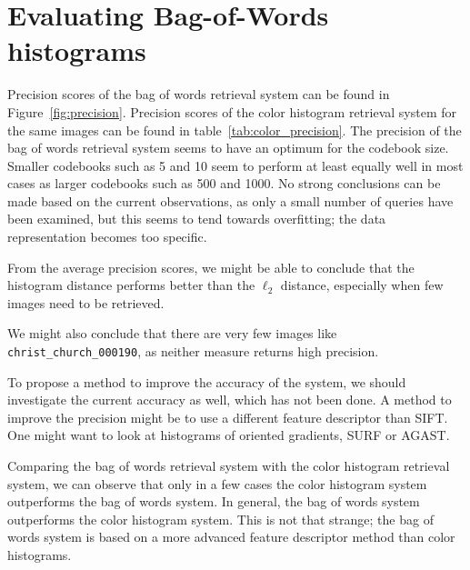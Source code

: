 \documentclass[a4paper,10pt,twoside]{article}
\begin{document}
\section{Evaluating Bag-of-Words histograms}
Precision scores of the bag of words retrieval system can be found in Figure~\ref{fig:precision}.  Precision scores of the color histogram retrieval system for the same images can be found in table~\ref{tab:color_precision}.  The precision of the bag of words retrieval system seems to have an optimum for the codebook size.  Smaller codebooks such as 5 and 10 seem to perform at least equally well in most cases as larger codebooks such as 500 and 1000.  No strong conclusions can be made based on the current observations, as only a small number of queries have been examined, but this seems to tend towards overfitting; the data representation becomes too specific.

From the average precision scores, we might be able to conclude that the histogram distance performs better than the $\ell_2$ distance, especially when few images need to be retrieved.

We might also conclude that there are very few images like \texttt{christ\_church\_000190}, as neither measure returns high precision.  

To propose a method to improve the accuracy of the system, we should investigate the current accuracy as well, which has not been done. A method to improve the precision might be to use a different feature descriptor than SIFT.  One might want to look at histograms of oriented gradients, SURF or AGAST.

Comparing the bag of words retrieval system with the color histogram retrieval system, we can observe that only in a few cases the color histogram system outperforms the bag of words system.  In general, the bag of words system outperforms the color histogram system.  This is not that strange; the bag of words system is based on a more advanced feature descriptor method than color histograms.
\end{document}

